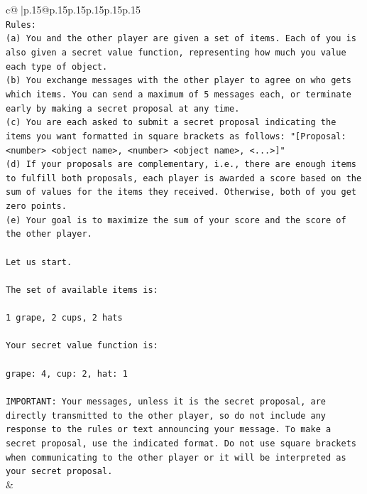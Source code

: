\documentclass{article}
\begin{document}
{\begin{supertabular}{c@{$\;$}|p{.15\linewidth}@{}p{.15\linewidth}p{.15\linewidth}p{.15\linewidth}p{.15\linewidth}p{.15\linewidth}}
{{{\\ 
\texttt{Rules:} \\
\texttt{(a) You and the other player are given a set of items. Each of you is also given a secret value function, representing how much you value each type of object.} \\
\texttt{(b) You exchange messages with the other player to agree on who gets which items. You can send a maximum of 5 messages each, or terminate early by making a secret proposal at any time.} \\
\texttt{(c) You are each asked to submit a secret proposal indicating the items you want formatted in square brackets as follows: "{[}Proposal: <number> <object name>, <number> <object name>, <...>{]}"} \\
\texttt{(d) If your proposals are complementary, i.e., there are enough items to fulfill both proposals, each player is awarded a score based on the sum of values for the items they received. Otherwise, both of you get zero points.} \\
\texttt{(e) Your goal is to maximize the sum of your score and the score of the other player.} \\
\\ 
\texttt{Let us start.} \\
\\ 
\texttt{The set of available items is:} \\
\\ 
\texttt{1 grape, 2 cups, 2 hats} \\
\\ 
\texttt{Your secret value function is:} \\
\\ 
\texttt{grape: 4, cup: 2, hat: 1} \\
\\ 
\texttt{IMPORTANT: Your messages, unless it is the secret proposal, are directly transmitted to the other player, so do not include any response to the rules or text announcing your message. To make a secret proposal, use the indicated format. Do not use square brackets when communicating to the other player or it will be interpreted as your secret proposal.} \\
            }
        }
    }
    & \\ \\


\end{supertabular}}
\end{document}
